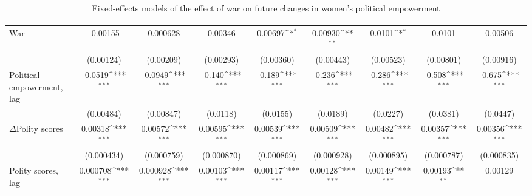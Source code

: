 \begin{table}[htbp]\centering
\def\sym#1{\ifmmode^{#1}\else\(^{#1}\)\fi}
\caption{Fixed-effects models of the effect of war on future changes in women's political empowerment\label{tab2}}
\begin{tabular}{l*{8}{c}}
\hline\hline
                    &&&&&&&&\\
\hline
War            &    -0.00155         &    0.000628         &     0.00346         &     0.00697\sym{*}  &     0.00930\sym{**} &      0.0101\sym{*}  &      0.0101         &     0.00506         \\
                    &   (0.00124)         &   (0.00209)         &   (0.00293)         &   (0.00360)         &   (0.00443)         &   (0.00523)         &   (0.00801)         &   (0.00916)         \\
[1em]
Political empowerment, lag   &     -0.0519\sym{***}&     -0.0949\sym{***}&      -0.140\sym{***}&      -0.189\sym{***}&      -0.236\sym{***}&      -0.286\sym{***}&      -0.508\sym{***}&      -0.675\sym{***}\\
                    &   (0.00484)         &   (0.00847)         &    (0.0118)         &    (0.0155)         &    (0.0189)         &    (0.0227)         &    (0.0381)         &    (0.0447)         \\
[1em]
$\Delta$Polity scores           &     0.00318\sym{***}&     0.00572\sym{***}&     0.00595\sym{***}&     0.00539\sym{***}&     0.00509\sym{***}&     0.00482\sym{***}&     0.00357\sym{***}&     0.00356\sym{***}\\
                    &  (0.000434)         &  (0.000759)         &  (0.000870)         &  (0.000869)         &  (0.000928)         &  (0.000895)         &  (0.000787)         &  (0.000835)         \\
[1em]
Polity scores, lag           &    0.000708\sym{***}&    0.000928\sym{***}&     0.00103\sym{***}&     0.00117\sym{***}&     0.00128\sym{***}&     0.00149\sym{***}&     0.00193\sym{**} &     0.00129         \\

\end{tabular}
\end{table}
